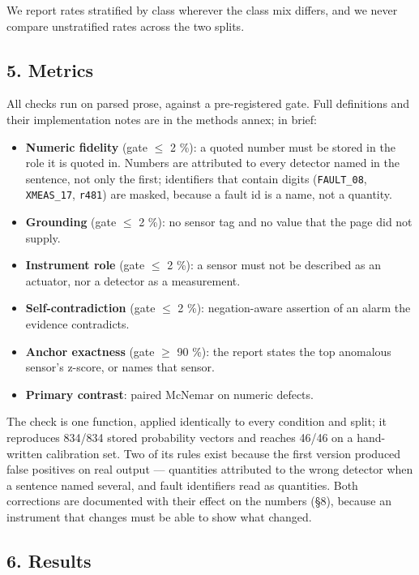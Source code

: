 \documentclass[
  10pt,
]{article}
\providecommand{\tightlist}{%
  \setlength{\itemsep}{0pt}\setlength{\parskip}{0pt}}
\begin{document}
We report rates stratified by class wherever the class mix differs, and
we never compare unstratified rates across the two splits.

\subsection{5. Metrics}\label{metrics}

All checks run on parsed prose, against a pre-registered gate. Full
definitions and their implementation notes are in the methods annex; in
brief:

\begin{itemize}
\tightlist
\item
  \textbf{Numeric fidelity} (gate $\leq$ 2 \%): a quoted number must be
  stored in the role it is quoted in. Numbers are attributed to every
  detector named in the sentence, not only the first; identifiers that
  contain digits (\texttt{FAULT\_08}, \texttt{XMEAS\_17}, \texttt{r481})
  are masked, because a fault id is a name, not a quantity.
\item
  \textbf{Grounding} (gate $\leq$ 2 \%): no sensor tag and no value that the
  page did not supply.
\item
  \textbf{Instrument role} (gate $\leq$ 2 \%): a sensor must not be described
  as an actuator, nor a detector as a measurement.
\item
  \textbf{Self-contradiction} (gate $\leq$ 2 \%): negation-aware assertion of
  an alarm the evidence contradicts.
\item
  \textbf{Anchor exactness} (gate $\geq$ 90 \%): the report states the top
  anomalous sensor's z-score, or names that sensor.
\item
  \textbf{Primary contrast}: paired McNemar on numeric defects.
\end{itemize}

The check is one function, applied identically to every condition and
split; it reproduces 834/834 stored probability vectors and reaches
46/46 on a hand-written calibration set. Two of its rules exist because
the first version produced false positives on real output --- quantities
attributed to the wrong detector when a sentence named several, and
fault identifiers read as quantities. Both corrections are documented
with their effect on the numbers (\S8), because an instrument that
changes must be able to show what changed.

\subsection{6. Results}\label{results}
\end{document}
